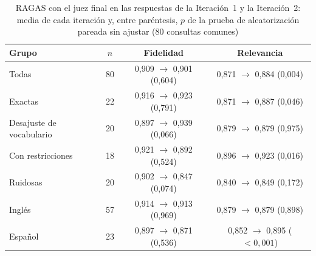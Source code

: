 \begin{table}[htbp!]
    \centering
    \caption{RAGAS con el juez final en las respuestas de la Iteración~1 y la Iteración~2: media de cada iteración y, entre paréntesis, $p$ de la prueba de aleatorización pareada sin ajustar (80 consultas comunes)}
    \label{tab:res-pe2-iteraciones}
    \small
    \begin{tabular}{|l|c|c|c|}
        \hline
        \textbf{Grupo} & \textbf{$n$} & \textbf{Fidelidad} & \textbf{Relevancia} \\
        \hline
        Todas & 80 & 0{,}909 $\rightarrow$ 0{,}901 (0{,}604) & 0{,}871 $\rightarrow$ 0{,}884 (0{,}004) \\
        \hline
        Exactas & 22 & 0{,}916 $\rightarrow$ 0{,}923 (0{,}791) & 0{,}871 $\rightarrow$ 0{,}887 (0{,}046) \\
        \hline
        Desajuste de vocabulario & 20 & 0{,}897 $\rightarrow$ 0{,}939 (0{,}066) & 0{,}879 $\rightarrow$ 0{,}879 (0{,}975) \\
        \hline
        Con restricciones & 18 & 0{,}921 $\rightarrow$ 0{,}892 (0{,}524) & 0{,}896 $\rightarrow$ 0{,}923 (0{,}016) \\
        \hline
        Ruidosas & 20 & 0{,}902 $\rightarrow$ 0{,}847 (0{,}074) & 0{,}840 $\rightarrow$ 0{,}849 (0{,}172) \\
        \hline
        Inglés & 57 & 0{,}914 $\rightarrow$ 0{,}913 (0{,}969) & 0{,}879 $\rightarrow$ 0{,}879 (0{,}898) \\
        \hline
        Español & 23 & 0{,}897 $\rightarrow$ 0{,}871 (0{,}536) & 0{,}852 $\rightarrow$ 0{,}895 ($< 0{,}001$) \\
        \hline
    \end{tabular}
\end{table}
